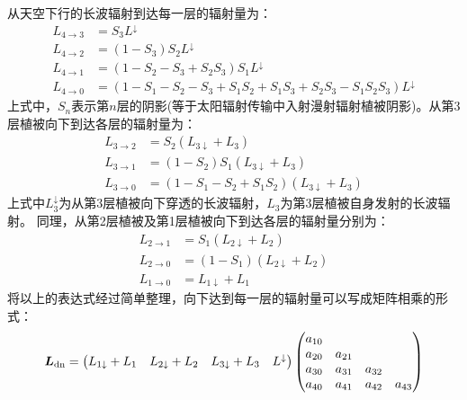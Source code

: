 从天空下行的长波辐射到达每一层的辐射量为：
\begin{equation}
\begin{aligned} L_{4 \rightarrow 3} &=S_{3} L^\downarrow \\ L_{4 \rightarrow 2} &=\left(1-S_{3}\right) S_{2} L^\downarrow 
    \\ L_{4 \rightarrow 1} &=\left(1-S_{2}-S_{3}+S_{2} S_{3}\right) S_{1} L^\downarrow \\ 
    L_{4 \rightarrow 0} &=\left(1-S_{1}-S_{2}-S_{3}+S_{1} S_{2}+S_{1} S_{3}+S_{2} S_{3}-S_{1} S_{2} S_{3}\right) L^\downarrow \end{aligned}
\end{equation}
上式中，$S_n$表示第$n$层的阴影(等于太阳辐射传输中入射漫射辐射植被阴影)。从第3层植被向下到达各层的辐射量为：
\begin{equation}
\begin{aligned}
L_{3 \rightarrow 2} &=S_{2}\left(L_{3 \downarrow}+L_{3}\right) \\[1ex]
L_{3 \rightarrow 1} &=\left(1-S_{2}\right) S_{1}\left(L_{3 \downarrow}+L_{3}\right) \\[1ex]
L_{3 \rightarrow 0} &=\left(1-S_{1}-S_{2}+S_{1} S_{2}\right)\left(L_{3 \downarrow}+L_{3}\right)
\end{aligned}
\end{equation}
上式中$L_3 ^\downarrow$为从第3层植被向下穿透的长波辐射，$L_3$为第3层植被自身发射的长波辐射。
同理，从第2层植被及第1层植被向下到达各层的辐射量分别为：
\begin{equation}
\begin{aligned}
L_{2 \rightarrow 1} &=S_{1}\left(L_{2 \downarrow}+L_{2}\right) \\[1ex] 
L_{2 \rightarrow 0} &=\left(1-S_{1}\right)\left(L_{2 \downarrow}+L_{2}\right) \\[1ex]
L_{1 \rightarrow 0} &=L_{1 \downarrow}+L_{1}
\end{aligned}
\end{equation}
将以上的表达式经过简单整理，向下达到每一层的辐射量可以写成矩阵相乘的形式：
\begin{equation}
\boldsymbol{L}_{\rm dn}=\left(\begin{matrix}L_{1\downarrow}+L_1&L_{2\downarrow}+L_2&L_{3\downarrow}+L_3&L^\downarrow\\
\end{matrix}\right)\left(\begin{matrix}a_{10}&&&\\a_{20}&a_{21}&&
    \\a_{30}&a_{31}&a_{32}&\\a_{40}&a_{41}&a_{42}&a_{43}\\\end{matrix}\right)
\end{equation}
